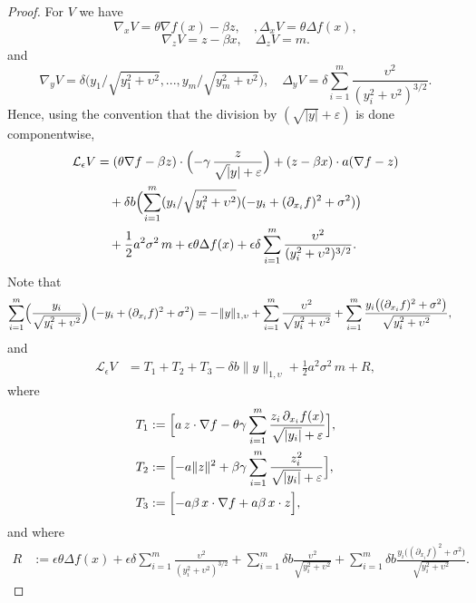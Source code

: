 \documentclass[11pt, a4paper,leqno]{amsart}
\theoremstyle{definition}
\numberwithin{equation}{section}
\begin{document}
\begin{proof} For $V$ we have
\[
\nabla_x V = \theta \nabla f(x)-\beta z,\quad,
\Delta_x V = \theta \Delta f(x),
\]
\[
\nabla_z V = z-\beta x,\quad
\Delta_z V = m.
\]
and
\[
\nabla_y V = \delta \bigl(y_1/\sqrt{y_1^2+\upsilon^2},...,y_m/\sqrt{y_m^2+\upsilon^2}\bigr),\quad
\Delta_y V = \delta \sum_{i=1}^m\frac {\upsilon^2}{(y_i^2+\upsilon^2)^{3/2}}.
\]
Hence, using the convention that the division by $(\sqrt{|y|}+\varepsilon)$ is done componentwise,
\[
\begin{aligned}
{\mathcal L}_\epsilon V
&= (\theta\nabla f-\beta z)\cdot\Bigl(-\gamma\,\frac{z}{\sqrt |y|+\varepsilon}\Bigr)
+ (z-\beta x)\cdot a(\nabla f-z) \\
&\quad +  {\delta b}\Bigl (\sum_{i=1}^m(y_i/\sqrt{y_i^2+\upsilon^2})(-y_i + (\partial_{x_i}f)^2 + \sigma^2)\bigr )\\
&\quad+ \frac 12 a^2\sigma^2\,m+\epsilon \theta \Delta f(x)+ {\epsilon\delta} \sum_{i=1}^m\frac {\upsilon^2}{(y_i^2+\upsilon^2)^{3/2}}.
\end{aligned}
\]
Note that
\[
\begin{aligned}
\sum_{i=1}^m\Bigl(\frac{y_i}{\sqrt{y_i^2 + \upsilon^2}}\Bigr)
\left(-y_i + (\partial_{x_i} f)^2 + \sigma^2\right)
&= -\|y\|_{1,\upsilon}+\sum_{i=1}^m\frac{\upsilon^2}{\sqrt{y_i^2 + \upsilon^2}}+ \sum_{i=1}^m\frac{y_i\big((\partial_{x_i} f)^2 + \sigma^2\big)}{\sqrt{y_i^2 + \upsilon^2}},
\end{aligned}
\]
and
\begin{equation}\label{eq:LV-expanded}
\begin{aligned}
{\mathcal L}_\epsilon V
&= T_1+T_2+T_3- \delta b\|y\|_{1,\upsilon}
+  \frac12 a^2\sigma^2\, m+R,
\end{aligned}
\end{equation}
where
\begin{align*}
T_1&:= \Bigl[a\,z\cdot\nabla f - \theta\gamma \sum_{i=1}^m \frac{z_i\,\partial_{x_i}f(x)}{\sqrt{|y_i|}+\varepsilon}\Bigr],\\
T_2&:= \Bigl[-a\|z\|^2 + \beta\gamma \sum_{i=1}^m \frac{z_i^2}{\sqrt{|y_i|}+\varepsilon}\Bigr], \\
T_3&:= \Bigl[-a\beta\, x\cdot\nabla f + a\beta\, x\cdot z\Bigr],
\end{align*}
and where
\begin{align*}
R&:=\epsilon \theta \Delta f(x)+{\epsilon\delta} \sum_{i=1}^m\frac {\upsilon^2}{(y_i^2+\upsilon^2)^{3/2}}+
\sum_{i=1}^m{\delta b}\frac{\upsilon^2}{\sqrt{y_i^2 + \upsilon^2}}+ \sum_{i=1}^m {\delta b}\frac{y_i\big((\partial_{x_i} f)^2 + \sigma^2\big)}{\sqrt{y_i^2 + \upsilon^2}}.

\end{align*}
\end{proof}
\end{document}
